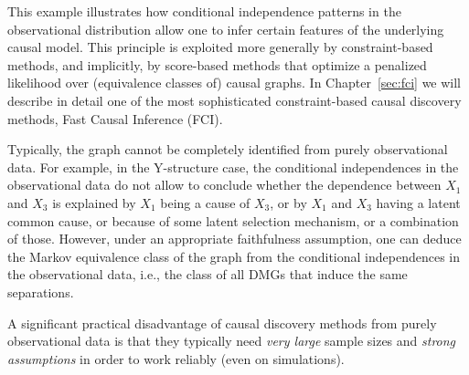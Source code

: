 This example illustrates how conditional independence patterns in the observational
distribution allow one to infer certain features of the underlying causal model. This
principle is exploited more generally by constraint-based methods, and implicitly,
by score-based methods that optimize a penalized likelihood over (equivalence classes of) causal graphs.
In Chapter~\ref{sec:fci} we will describe in detail one of the most sophisticated constraint-based
causal discovery methods, Fast Causal Inference (FCI).

Typically, the graph cannot be completely identified from purely observational data.
For example, in the Y-structure case, the conditional independences in the observational data
do not allow to conclude whether the dependence between $X_1$ and $X_3$ is explained by
$X_1$ being a cause of $X_3$, or by $X_1$ and $X_3$ having a latent common cause,
or because of some latent selection mechanism, or a combination of those.
However, under an appropriate faithfulness assumption, one can deduce the Markov
equivalence class of the graph from the conditional independences in the observational data, 
i.e., the class of all DMGs that induce the same separations.

A significant practical disadvantage of causal discovery methods from purely observational data is that
they typically need \emph{very large} sample sizes and \emph{strong assumptions} in order to work reliably (even on simulations).

